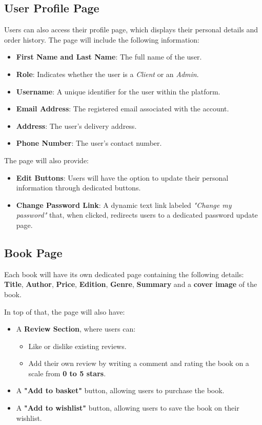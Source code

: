 \subsection{User Profile Page} \label{sec:profile}
Users can also access their profile page, which displays their personal details and order history. The page will include the following information:

\begin{itemize}
    \item \textbf{First Name and Last Name}: The full name of the user.
    \item \textbf{Role}: Indicates whether the user is a \textit{Client} or an \textit{Admin}.
    \item \textbf{Username}: A unique identifier for the user within the platform.
    \item \textbf{Email Address}: The registered email associated with the account.
    \item \textbf{Address}: The user's delivery address.
    \item \textbf{Phone Number}: The user's contact number.
\end{itemize}

The page will also provide:
\begin{itemize}
    \item \textbf{Edit Buttons}: Users will have the option to update their personal information through dedicated buttons.
    \item \textbf{Change Password Link}: A dynamic text link labeled \textit{"Change my password"} that, when clicked, redirects users to a dedicated password update page.
\end{itemize}

\subsection{Book Page} \label{sec:book}
Each book will have its own dedicated page containing the following details: \textbf{Title}, \textbf{Author}, \textbf{Price}, \textbf{Edition}, \textbf{Genre}, \textbf{Summary} and a \textbf{cover image} of the book.

In top of that, the page will also have:
\begin{itemize}
    \item A \textbf{Review Section}, where users can:
    \begin{itemize}
        \item Like or dislike existing reviews.
        \item Add their own review by writing a comment and rating the book on a scale from \textbf{0 to 5 stars}.
    \end{itemize}
    \item A \textbf{"Add to basket"} button, allowing users to purchase the book.
    \item A \textbf{"Add to wishlist"} button, allowing users to save the book on their wishlist.
\end{itemize}

